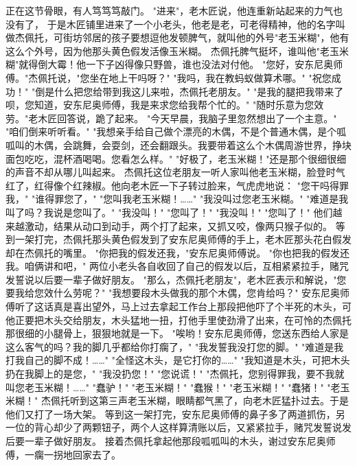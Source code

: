 \documentclass[12pt,UTF8]{ctexbook}
\begin{document}
正在这节骨眼，有人笃笃笃敲门。
"进来"，老木匠说，他连重新站起来的力气也没有了，
于是木匠铺里进来了一个小老头，他老是老，可老得精神，他的名字叫做杰佩托，可街坊邻居的孩子要想逗他发顿脾气，就叫他的外号"老玉米糊"，他有这么个外号，因为他那头黄色假发活像玉米糊。
杰佩托脾气挺坏，谁叫他"老玉米糊"就得倒大霉！他一下子凶得像只野兽，谁也没法对付他。
"您好，安东尼奥师傅。"杰佩托说，"您坐在地上干吗呀？"
"我吗，我在教蚂蚁做算术哪。"
"祝您成功！"
"倒是什么把您给带到我这儿来啦，杰佩托老朋友。"
"是我的腿把我带来了呗，您知道，安东尼奥师傅，我是来求您给我帮个忙的。"
"随时乐意为您效劳。"老木匠回答说，跪了起来。
"今天早晨，我脑子里忽然想出了一个主意。"
"咱们倒来听听看。"
"我想亲手给自己做个漂亮的木偶，不是个普通木偶，是个呱呱叫的木偶，会跳舞，会耍剑，还会翻跟头。我要带着这么个木偶周游世界，挣块面包吃吃，混杯酒喝喝。您看怎么样。"
"好极了，老玉米糊！"还是那个很细很细的声音不却从哪儿叫起来。
杰佩托这位老朋友一听人家叫他老玉米糊，脸登时气红了，红得像个红辣椒。他向老木匠一下子转过脸来，气虎虎地说：
"您干吗得罪我，"
"谁得罪您了，"
"您叫我老玉米糊！……"
"我没叫过您老玉米糊。"
"难道是我叫了吗？我说是您叫了。"
"我没叫！"
"您叫了！"
"我没叫！"
"您叫了！"
他们越来越激动，结果从动口到动手，两个打了起来，又抓又咬，像两只猴子似的。
等到一架打完，杰佩托那头黄色假发到了安东尼奥师傅的手上，老木匠那头花白假发却在杰佩托的嘴里。
"你把我的假发还我，"安东尼奥师傅说。
"你也把我的假发还我。咱俩讲和吧，"
两位小老头各自收回了自己的假发以后，互相紧紧拉手，赌咒发誓说以后要一辈子做好朋友。
"那么，杰佩托老朋友"，老木匠表示和解说，"您要我给您效什么劳呢？"
"我想要段木头做我的那个木偶，您肯给吗？"
安东尼奥师傅听了这话真是喜出望外，马上过去拿起工作台上那段把他吓了个半死的木头，可他正要把木头交给朋友，木头猛地一扭，打他手里使劲滑了出来，在可怜的杰佩托那很细的小腿骨上，狠狠地就是一下。
"唉哟！安东尼奥师傅，您送东西给人家是这么客气的吗？我的脚几乎都给你打瘸了，"
"我发誓我没打您的脚。"
"难道是我打我自己的脚不成！……"
"全怪这木头，是它打你的……"
"我知道是木头，可把木头扔在我脚上的是您，"
"我没扔您！"
"您说谎！"
"杰佩托，您别得罪我，要不我就叫您老玉米糊！……"
"蠢驴！"
"老玉米糊！"
"蠢猴！"
"老玉米糊！"
"蠢猪！"
"老玉米糊！"
杰佩托听到这第三声老玉米糊，眼睛都气黑了，向老木匠猛扑过去。于是他们又打了一场大架。
等到这一架打完，安东尼奥师傅的鼻子多了两道抓伤，另一位的背心却少了两颗钮子，两个人这样算清账以后，又紧紧拉手，赌咒发誓说发后要一辈子做好朋友。
接着杰佩托拿起他那段呱呱叫的木头，谢过安东尼奥师傅，一瘸一拐地回家去了。

\chapter{}
\end{document}

